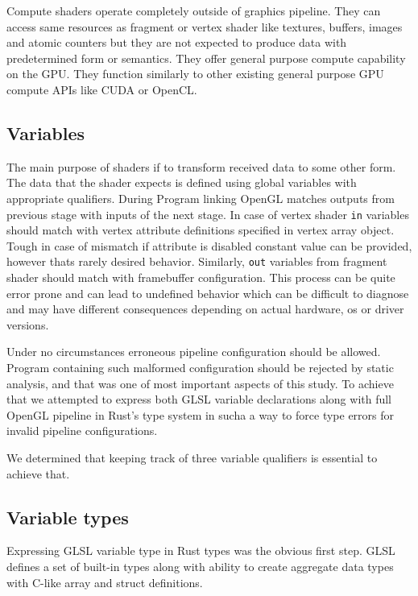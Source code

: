 Compute shaders operate completely outside of graphics pipeline. They can access same resources as fragment or vertex shader like textures, buffers, images and atomic counters
but they are not expected to produce data with predetermined form or semantics. They offer general purpose compute capability on the GPU. 
They function similarly to other existing general purpose GPU compute APIs like CUDA or OpenCL.

\subsection{Variables}

The main purpose of shaders if to transform received data to some other form. The data that the shader expects is defined using global variables with appropriate qualifiers.
During Program linking OpenGL matches outputs from previous stage with inputs of the next stage. 
In case of vertex shader \texttt{in} variables should match with vertex attribute definitions specified in vertex array object.
Tough in case of mismatch if attribute is disabled constant value can be provided, however thats rarely desired behavior.
Similarly, \texttt{out} variables from fragment shader should match with framebuffer configuration.
This process can be quite error prone and can lead to undefined behavior which can be difficult to diagnose and may have different consequences depending on actual hardware, os or driver versions.

Under no circumstances erroneous pipeline configuration should be allowed. Program containing such malformed configuration should be rejected by static analysis, and that was one of most important aspects of this study.
To achieve that we attempted to express both GLSL variable declarations along with full OpenGL pipeline in Rust's type system in sucha a way to force type errors for invalid pipeline configurations.

We determined that keeping track of three variable qualifiers is essential to achieve that.

\subsection{Variable types}

Expressing GLSL variable type in Rust types was the obvious first step. GLSL defines a set of built-in types along with ability to create aggregate data types with C-like array and struct definitions.

